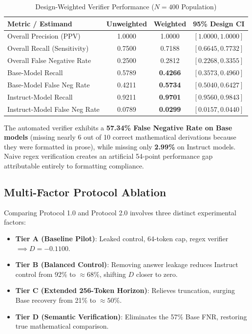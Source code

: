 \documentclass[conference]{IEEEtran}
\begin{document}
\begin{table}[htbp]
\caption{Design-Weighted Verifier Performance ($N=400$ Population)}
\label{tab:verifier_weighted}
\centering
\small
\begin{tabularx}{\columnwidth}{Xccc}
\toprule
\textbf{Metric / Estimand} & \textbf{Unweighted} & \textbf{Weighted} & \textbf{95\% Design CI} \\
\midrule
Overall Precision (PPV) & 1.0000 & 1.0000 & $[1.0000, 1.0000]$ \\
Overall Recall (Sensitivity) & 0.7500 & 0.7188 & $[0.6645, 0.7732]$ \\
Overall False Negative Rate & 0.2500 & 0.2812 & $[0.2268, 0.3355]$ \\
\midrule
Base-Model Recall & 0.5789 & \textbf{0.4266} & $[0.3573, 0.4960]$ \\
Base-Model False Neg Rate & 0.4211 & \textbf{0.5734} & $[0.5040, 0.6427]$ \\
Instruct-Model Recall & 0.9211 & \textbf{0.9701} & $[0.9560, 0.9843]$ \\
Instruct-Model False Neg Rate & 0.0789 & \textbf{0.0299} & $[0.0157, 0.0440]$ \\
\bottomrule
\end{tabularx}
\vspace{-1.5mm}
\end{table}

The automated verifier exhibits a \textbf{57.34\% False Negative Rate on Base models} (missing nearly 6 out of 10 correct mathematical derivations because they were formatted in prose), while missing only \textbf{2.99\%} on Instruct models. Naive regex verification creates an artificial 54-point performance gap attributable entirely to formatting compliance.

\subsection{Multi-Factor Protocol Ablation}
Comparing Protocol 1.0 and Protocol 2.0 involves three distinct experimental factors:
\begin{itemize}
    \item \textbf{Tier A (Baseline Pilot)}: Leaked control, 64-token cap, regex verifier $\implies D = -0.1100$.
    \item \textbf{Tier B (Balanced Control)}: Removing answer leakage reduces Instruct control from 92\% to $\approx 68\%$, shifting $D$ closer to zero.
    \item \textbf{Tier C (Extended 256-Token Horizon)}: Relieves truncation, surging Base recovery from 21\% to $\approx 50\%$.
    \item \textbf{Tier D (Semantic Verification)}: Eliminates the 57\% Base FNR, restoring true mathematical comparison.
\end{itemize}
\end{document}
